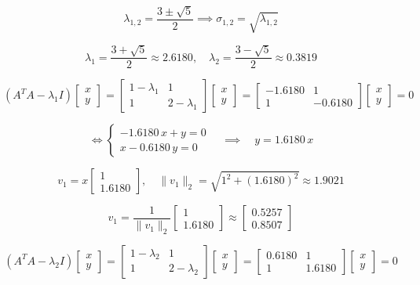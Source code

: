 \documentclass[12pt,a4paper]{article}
\begin{document}
\[
\lambda_{1,2} = \dfrac{3 \pm \sqrt{5}}{2} \implies
\sigma_{1,2} = \sqrt{\lambda_{1,2}}
\]

\[
\lambda_1 = \dfrac{3 + \sqrt{5}}{2} \approx 2.6180, \quad
\lambda_2 = \dfrac{3 - \sqrt{5}}{2} \approx 0.3819
\]

\[
\left(A^T A - \lambda_1 I\right)
\begin{bmatrix} x \\ y \end{bmatrix} =
\begin{bmatrix}
1 - \lambda_1 & 1 \\
1 & 2 - \lambda_1
\end{bmatrix}
\begin{bmatrix} x \\ y \end{bmatrix} =
\begin{bmatrix}
-1.6180 & 1 \\
1 & -0.6180
\end{bmatrix}
\begin{bmatrix} x \\ y \end{bmatrix} = 0
\]

\[
\Longleftrightarrow
\begin{cases}
-1.6180\,x + y = 0 \\
x - 0.6180\,y = 0
\end{cases}
\quad \implies \quad y = 1.6180\,x
\]

\[
v_1 = x \begin{bmatrix} 1 \\ 1.6180 \end{bmatrix}, \quad
\|v_1\|_2 = \sqrt{1^2 + (1.6180)^2} \approx 1.9021
\]

\[
v_1 = \frac{1}{\|v_1\|_2} \begin{bmatrix} 1 \\ 1.6180 \end{bmatrix} \approx
\begin{bmatrix} 0.5257 \\ 0.8507 \end{bmatrix}
\]

\[
\left(A^T A - \lambda_2 I\right)
\begin{bmatrix} x \\ y \end{bmatrix} =
\begin{bmatrix}
1 - \lambda_2 & 1 \\
1 & 2 - \lambda_2
\end{bmatrix}
\begin{bmatrix} x \\ y \end{bmatrix} =
\begin{bmatrix}
0.6180 & 1 \\
1 & 1.6180
\end{bmatrix}
\begin{bmatrix} x \\ y \end{bmatrix} = 0
\]
\end{document}
